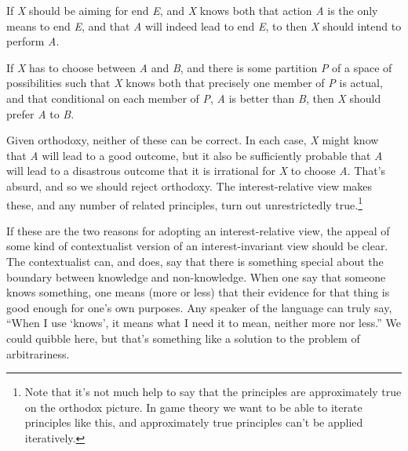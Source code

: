 \documentclass[
  11pt,
]{book}
\providecommand{\tightlist}{%
  \setlength{\itemsep}{0pt}\setlength{\parskip}{0pt}}
\begin{document}
\begin{description}
\tightlist
\item[Means-End Rationality]
If \emph{X} should be aiming for end \emph{E}, and \emph{X} knows both that action \emph{A} is the only means to end \emph{E}, and that \emph{A} will indeed lead to end \emph{E}, to then \emph{X} should intend to perform \emph{A}.
\item[Strict Dominance Reasoning]
If \emph{X} has to choose between \emph{A} and \emph{B}, and there is some partition \emph{P} of a space of possibilities such that \emph{X} knows both that precisely one member of \emph{P} is actual, and that conditional on each member of \emph{P}, \emph{A} is better than \emph{B}, then \emph{X} should prefer \emph{A} to \emph{B}.
\end{description}

Given orthodoxy, neither of these can be correct. In each case, \emph{X} might know that \emph{A} will lead to a good outcome, but it also be sufficiently probable that \emph{A} will lead to a disastrous outcome that it is irrational for \emph{X} to choose \emph{A}. That's absurd, and so we should reject orthodoxy. The interest-relative view makes these, and any number of related principles, turn out unrestrictedly true.\footnote{Note that it's not much help to say that the principles are approximately true on the orthodox picture. In game theory we want to be able to iterate principles like this, and approximately true principles can't be applied iteratively.}

If these are the two reasons for adopting an interest-relative view, the appeal of some kind of contextualist version of an interest-invariant view should be clear. The contextualist can, and does, say that there is something special about the boundary between knowledge and non-knowledge. When one say that someone knows something, one means (more or less) that their evidence for that thing is good enough for one's own purposes. Any speaker of the language can truly say, ``When I use `knows', it means what I need it to mean, neither more nor less.'' We could quibble here, but that's something like a solution to the problem of arbitrariness.
\end{document}
